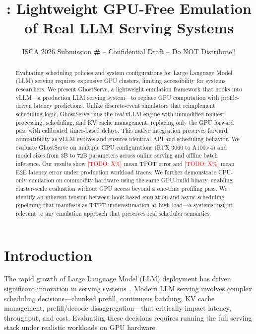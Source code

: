 \documentclass[conference]{IEEEtran}
\title{\sysname{}: Lightweight GPU-Free Emulation of Real LLM Serving Systems}
\author{\normalsize{ISCA 2026 Submission
    \textbf{\#\iscasubmissionnumber} -- Confidential Draft -- Do NOT Distribute!!}}
\newcommand{\sysname}{GhostServe}
\newcommand{\todo}[1]{\textcolor{red}{[TODO: #1]}}
\begin{document}
\maketitle
\thispagestyle{plain}
\pagestyle{plain}


\begin{abstract}
Evaluating scheduling policies and system configurations for Large Language Model (LLM) serving requires expensive GPU clusters, limiting accessibility for systems researchers. We present \sysname{}, a lightweight emulation framework that hooks into vLLM---a production LLM serving system---to replace GPU computation with profile-driven latency predictions. Unlike discrete-event simulators that reimplement scheduling logic, \sysname{} runs the \emph{real} vLLM engine with unmodified request processing, scheduling, and KV cache management, replacing only the GPU forward pass with calibrated timer-based delays. This native integration preserves forward compatibility as vLLM evolves and ensures identical API and scheduling behavior. We evaluate \sysname{} on multiple GPU configurations (RTX 3060 to A100$\times$4) and model sizes from 3B to 72B parameters across online serving and offline batch inference. Our results show \todo{X\%} mean TPOT error and \todo{X\%} mean E2E latency error under production workload traces. We further demonstrate CPU-only emulation on commodity hardware using the same GPU-build binary, enabling cluster-scale evaluation without GPU access beyond a one-time profiling pass. We identify an inherent tension between hook-based emulation and async scheduling pipelining that manifests as TTFT underestimation at high load---a systems insight relevant to any emulation approach that preserves real scheduler semantics.
\end{abstract}

\section{Introduction}

The rapid growth of Large Language Model (LLM) deployment has driven significant innovation in serving systems~\cite{kwon2023vllm, yu2022orca, zheng2024sglang}. Modern LLM serving involves complex scheduling decisions---chunked prefill, continuous batching, KV cache management, prefill/decode disaggregation---that critically impact latency, throughput, and cost. Evaluating these decisions requires running the full serving stack under realistic workloads on GPU hardware.
\end{document}
